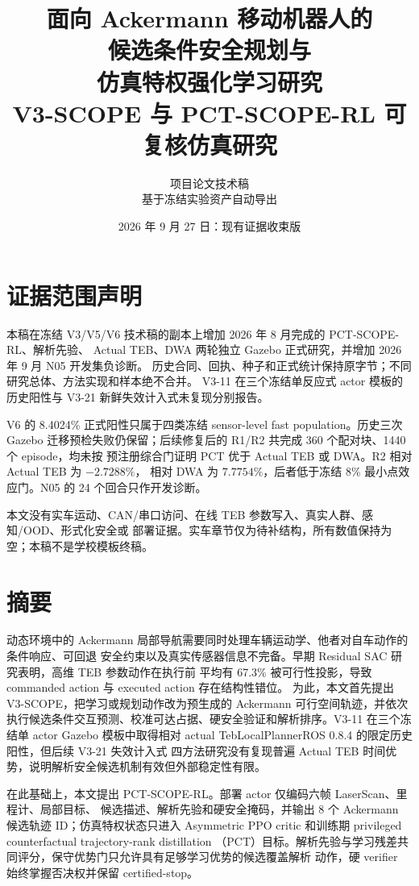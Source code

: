 \documentclass[12pt,a4paper,oneside]{report}
\title{\Huge 面向 Ackermann 移动机器人的\\候选条件安全规划与\\仿真特权强化学习研究\\[0.8em]\Large V3-SCOPE 与 PCT-SCOPE-RL 可复核仿真研究}
\author{项目论文技术稿\\\small 基于冻结实验资产自动导出}
\date{2026 年 9 月 27 日：现有证据收束版}
\begin{document}
\maketitle

\chapter*{证据范围声明}
本稿在冻结 V3/V5/V6 技术稿的副本上增加 2026 年 8 月完成的 PCT-SCOPE-RL、解析先验、
Actual TEB、DWA 两轮独立 Gazebo 正式研究，并增加 2026 年 9 月 N05 开发集负诊断。
历史合同、回执、种子和正式统计保持原字节；不同研究总体、方法实现和样本绝不合并。
V3-11 在三个冻结单反应式 actor 模板的历史阳性与 V3-21 新鲜失效计入式未复现分别报告。

V6 的 8.4024\% 正式阳性只属于四类冻结 sensor-level fast population。历史三次 Gazebo
迁移预检失败仍保留；后续修复后的 R1/R2 共完成 360 个配对块、1440 个 episode，均未按
预注册综合门证明 PCT 优于 Actual TEB 或 DWA。R2 相对 Actual TEB 为 $-2.7288\%$，
相对 DWA 为 $7.7754\%$，后者低于冻结 8\% 最小点效应门。N05 的 24 个回合只作开发诊断。

本文没有实车运动、CAN/串口访问、在线 TEB 参数写入、真实人群、感知/OOD、形式化安全或
部署证据。实车章节仅为待补结构，所有数值保持为空；本稿不是学校模板终稿。

\chapter*{摘要}
动态环境中的 Ackermann 局部导航需要同时处理车辆运动学、他者对自车动作的条件响应、可回退
安全约束以及真实传感器信息不完备。早期 Residual SAC 研究表明，高维 TEB 参数动作在执行前
平均有 67.3\% 被可行性投影，导致 commanded action 与 executed action 存在结构性错位。
为此，本文首先提出 V3-SCOPE，把学习或规划动作改为预生成的 Ackermann 可行空间轨迹，并依次
执行候选条件交互预测、校准可达占据、硬安全验证和解析排序。V3-11 在三个冻结单 actor Gazebo
模板中取得相对 actual TebLocalPlannerROS 0.8.4 的限定历史阳性，但后续 V3-21 失效计入式
四方法研究没有复现普遍 Actual TEB 时间优势，说明解析安全候选机制有效但外部稳定性有限。

在此基础上，本文提出 PCT-SCOPE-RL。部署 actor 仅编码六帧 LaserScan、里程计、局部目标、
候选描述、解析先验和硬安全掩码，并输出 8 个 Ackermann 候选轨迹 ID；仿真特权状态只进入
Asymmetric PPO critic 和训练期 privileged counterfactual trajectory-rank distillation
（PCT）目标。解析先验与学习残差共同评分，保守优势门只允许具有足够学习优势的候选覆盖解析
动作，硬 verifier 始终掌握否决权并保留 certified-stop。
\end{document}
